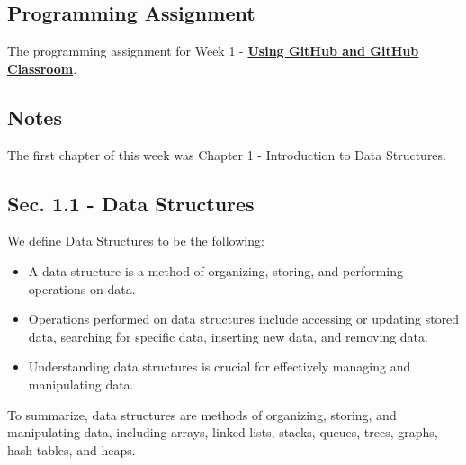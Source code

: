 \subsection{Programming Assignment}

The programming assignment for Week 1 - \href{https://github.com/cu-cspb-2270-Summer-2023/pa0-RelativiBit}{\textbf{Using GitHub and GitHub Classroom}}. \\

\subsection{Notes}
The first chapter of this week was Chapter 1 - Introduction to Data Structures. \\

\subsection{Sec. 1.1 - Data Structures}
\noindent We define Data Structures to be the following:
\begin{itemize}
    \item A data structure is a method of organizing, storing, and performing operations on data.
    \item Operations performed on data structures include accessing or updating stored data, searching for specific data, inserting new data, and removing data.
    \item Understanding data structures is crucial for effectively managing and manipulating data.
\end{itemize}
To summarize, data structures are methods of organizing, storing, and manipulating data, including arrays, linked lists, stacks, queues, trees, graphs, hash tables,
and heaps. \\

